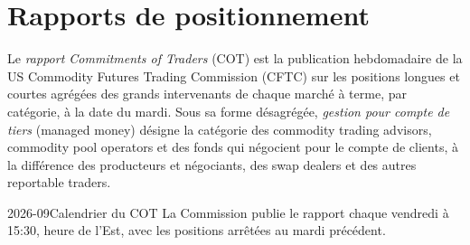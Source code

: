\section{Rapports de positionnement}

\begin{definition}\label{def:m3:agriculturals-and-softs:cot}
Le \emph{rapport Commitments of Traders} (COT) est la publication hebdomadaire
de la US Commodity Futures Trading Commission (CFTC) sur les positions longues et courtes agrégées
des grands intervenants de chaque marché à terme, par catégorie, à la date du mardi. Sous sa forme désagrégée,
\emph{gestion pour compte de tiers} (managed money) désigne la catégorie des commodity trading advisors, commodity
pool operators et des fonds qui négocient pour le compte de clients, à la différence des producteurs et négociants,
des swap dealers et des autres reportable traders.
\end{definition}

\begin{dated}{2026-09}{Calendrier du COT}\label{dat:m3:agriculturals-and-softs:cot}
La Commission publie le rapport chaque vendredi à 15:30, heure de l'Est, avec les positions arrêtées au
mardi précédent.
\end{dated}

